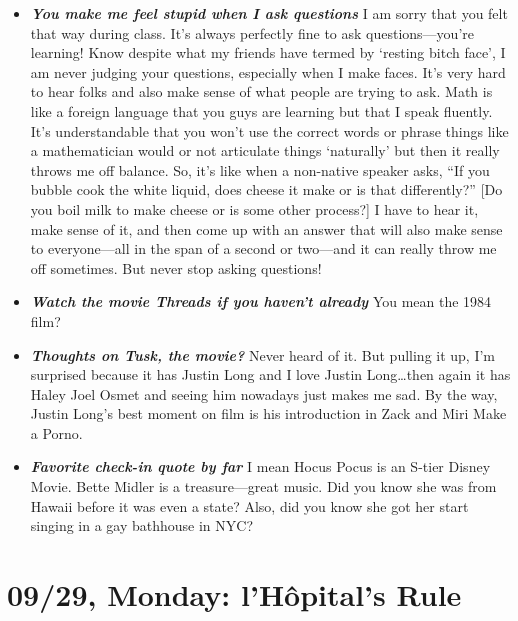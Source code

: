 \documentclass[11pt,letterpaper]{article}
\begin{document}
\begin{itemize}
\item {\bfseries\itshape You make me feel stupid when I ask questions} I am sorry that you felt that way during class. It's always perfectly fine to ask questions---you're learning! Know despite what my friends have termed by `resting bitch face', I am never judging your questions, especially when I make faces. It's very hard to hear folks and also make sense of what people are trying to ask. Math is like a foreign language that you guys are learning but that I speak fluently. It's understandable that you won't use the correct words or phrase things like a mathematician would or not articulate things `naturally' but then it really throws me off balance. So, it's like when a non-native speaker asks, ``If you bubble cook the white liquid, does cheese it make or is that differently?'' [Do you boil milk to make cheese or is some other process?] I have to hear it, make sense of it, and then come up with an answer that will also make sense to everyone---all in the span of a second or two---and it can really throw me off sometimes. But never stop asking questions! 

\item {\bfseries\itshape Watch the movie Threads if you haven't already} You mean the 1984 film?

\item {\bfseries\itshape Thoughts on Tusk, the movie?} Never heard of it. But pulling it up, I'm surprised because it has Justin Long and I love Justin Long\dots then again it has Haley Joel Osmet and seeing him nowadays just makes me sad. By the way, Justin Long's best moment on film is his introduction in Zack and Miri Make a Porno.

\item {\bfseries\itshape Favorite check-in quote by far} I mean Hocus Pocus is an S-tier Disney Movie. Bette Midler is a treasure---great music. Did you know she was from Hawaii before it was even a state? Also, did you know she got her start singing in a gay bathhouse in NYC?
\end{itemize}

\newpage
\section*{09/29, Monday: l'H\^{o}pital's Rule\label{09-29}}
\end{document}
